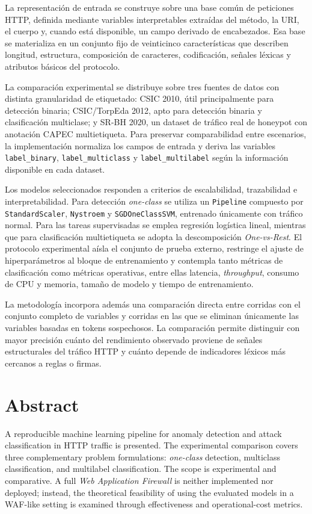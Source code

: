 \documentclass[12pt,oneside]{report}
\begin{document}
La representación de entrada se construye sobre una base común de peticiones HTTP, definida mediante variables interpretables extraídas del método, la URI, el cuerpo y, cuando está disponible, un campo derivado de encabezados. Esa base se materializa en un conjunto fijo de veinticinco características que describen longitud, estructura, composición de caracteres, codificación, señales léxicas y atributos básicos del protocolo.

La comparación experimental se distribuye sobre tres fuentes de datos con distinta granularidad de etiquetado: CSIC 2010, útil principalmente para detección binaria; CSIC/TorpEda 2012, apto para detección binaria y clasificación multiclase; y SR-BH 2020, un dataset de tráfico real de honeypot con anotación CAPEC multietiqueta. Para preservar comparabilidad entre escenarios, la implementación normaliza los campos de entrada y deriva las variables \texttt{label\_binary}, \texttt{label\_multiclass} y \texttt{label\_multilabel} según la información disponible en cada dataset.

Los modelos seleccionados responden a criterios de escalabilidad, trazabilidad e interpretabilidad. Para detección \textit{one-class} se utiliza un \texttt{Pipeline} compuesto por \texttt{StandardScaler}, \texttt{Nystroem} y \texttt{SGDOneClassSVM}, entrenado únicamente con tráfico normal. Para las tareas supervisadas se emplea regresión logística lineal, mientras que para clasificación multietiqueta se adopta la descomposición \textit{One-vs-Rest}. El protocolo experimental aísla el conjunto de prueba externo, restringe el ajuste de hiperparámetros al bloque de entrenamiento y contempla tanto métricas de clasificación como métricas operativas, entre ellas latencia, \textit{throughput}, consumo de CPU y memoria, tamaño de modelo y tiempo de entrenamiento.

La metodología incorpora además una comparación directa entre corridas con el conjunto completo de variables y corridas en las que se eliminan únicamente las variables basadas en tokens sospechosos. La comparación permite distinguir con mayor precisión cuánto del rendimiento observado proviene de señales estructurales del tráfico HTTP y cuánto depende de indicadores léxicos más cercanos a reglas o firmas.

\chapter*{Abstract}
A reproducible machine learning pipeline for anomaly detection and attack classification in HTTP traffic is presented. The experimental comparison covers three complementary problem formulations: \textit{one-class} detection, multiclass classification, and multilabel classification. The scope is experimental and comparative. A full \textit{Web Application Firewall} is neither implemented nor deployed; instead, the theoretical feasibility of using the evaluated models in a WAF-like setting is examined through effectiveness and operational-cost metrics.
\end{document}
